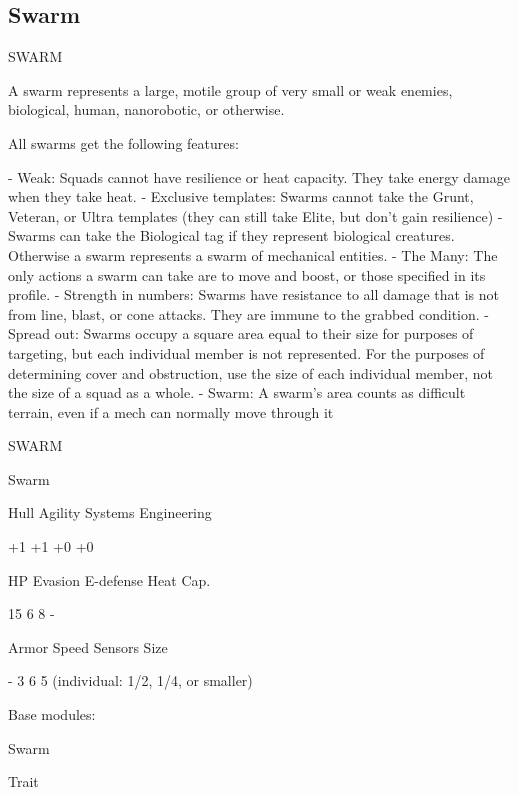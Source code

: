 \subsection{Swarm}
                                                   SWARM

A swarm represents a large, motile group of very small or weak enemies, biological, human,
nanorobotic, or otherwise.

All swarms get the following features:

    -    Weak: Squads cannot have resilience or heat capacity. They take energy damage when
         they take heat.
    -    Exclusive templates: Swarms cannot take the Grunt, Veteran, or Ultra templates (they
         can still take Elite, but don’t gain resilience)
    -    Swarms can take the Biological tag if they represent biological creatures. Otherwise a
         swarm represents a swarm of mechanical entities.
    -    The Many: The only actions a swarm can take are to move and boost, or those specified
         in its profile.
    -    Strength in numbers: Swarms have resistance to all damage that is not from line, blast,
         or cone attacks. They are immune to the grabbed condition.
    -    Spread out: Swarms occupy a square area equal to their size for purposes of targeting,
         but each individual member is not represented. For the purposes of determining cover
         and obstruction, use the size of each individual member, not the size of a squad as a
         whole.
    -    Swarm: A swarm’s area counts as difficult terrain, even if a mech can normally move
         through it

       SWARM

       Swarm

       Hull       Agility      Systems       Engineering

       +1         +1           +0            +0

       HP         Evasion      E-defense     Heat Cap.

       15         6            8             -

       Armor      Speed        Sensors       Size

       -          3            6             5 (individual:
                                             1/2, 1/4, or
                                             smaller)

Base modules:

Swarm

Trait

